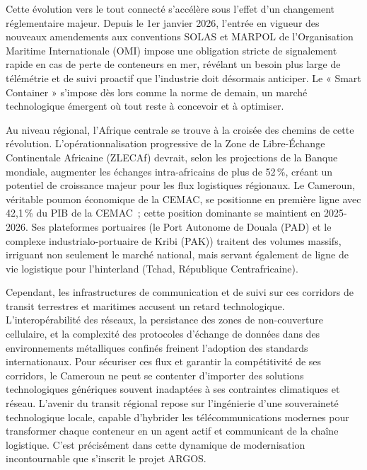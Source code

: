 Cette évolution vers le tout connecté s’accélère sous l’effet d’un changement réglementaire majeur. Depuis le 1er janvier 2026, l’entrée en vigueur des nouveaux amendements aux conventions SOLAS et MARPOL de l’Organisation Maritime Internationale (OMI) impose une obligation stricte de signalement rapide en cas de perte de conteneurs en mer, révélant un besoin plus large de télémétrie et de suivi proactif que l’industrie doit désormais anticiper\cite{omi2026}. Le « Smart Container » s’impose dès lors comme la norme de demain, un marché technologique émergent où tout reste à concevoir et à optimiser.

Au niveau régional, l’Afrique centrale se trouve à la croisée des chemins de cette révolution. L’opérationnalisation progressive de la Zone de Libre-Échange Continentale Africaine (ZLECAf) devrait, selon les projections de la Banque mondiale, augmenter les échanges intra-africains de plus de 52\,\%\cite{banquemondiale2025}, créant un potentiel de croissance majeur pour les flux logistiques régionaux. Le Cameroun, véritable poumon économique de la CEMAC, se positionne en première ligne avec 42,1\,\% du PIB de la CEMAC\cite{tresor2025}\ ; cette position dominante se maintient en 2025-2026\cite{cemac2025}. Ses plateformes portuaires (le Port Autonome de Douala (PAD) et le complexe industrialo-portuaire de Kribi (PAK)) traitent des volumes massifs, irriguant non seulement le marché national, mais servant également de ligne de vie logistique pour l’hinterland (Tchad, République Centrafricaine)\cite{cncc2025}.

Cependant, les infrastructures de communication et de suivi sur ces corridors de transit terrestres et maritimes accusent un retard technologique\cite{agenceecofin}. L’interopérabilité des réseaux, la persistance des zones de non-couverture cellulaire, et la complexité des protocoles d’échange de données dans des environnements métalliques confinés freinent l’adoption des standards internationaux. Pour sécuriser ces flux et garantir la compétitivité de ses corridors, le Cameroun ne peut se contenter d’importer des solutions technologiques génériques souvent inadaptées à ses contraintes climatiques et réseau. L’avenir du transit régional repose sur l’ingénierie d’une souveraineté technologique locale, capable d’hybrider les télécommunications modernes pour transformer chaque conteneur en un agent actif et communicant de la chaîne logistique. C’est précisément dans cette dynamique de modernisation incontournable que s’inscrit le projet ARGOS.

